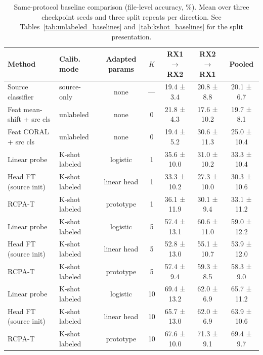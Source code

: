 \begin{table}[t]
\caption{Same-protocol baseline comparison (file-level accuracy, \%). Mean over three checkpoint seeds and three split repeats per direction. See Tables~\ref{tab:unlabeled_baselines} and~\ref{tab:kshot_baselines} for the split presentation.}
\label{tab:sota_baselines}
\centering
\small
\begin{tabular}{llccccc}
\toprule
Method & Calib. mode & Adapted params & $K$ & RX1$\rightarrow$RX2 & RX2$\rightarrow$RX1 & Pooled \\
\midrule
Source classifier & source-only & none & --- & 19.4 ± 3.4 & 20.8 ± 8.8 & 20.1 ± 6.7 \\
Feat mean-shift + src cls & unlabeled & none & 0 & 21.8 ± 4.3 & 17.6 ± 10.2 & 19.7 ± 8.1 \\
Feat CORAL + src cls & unlabeled & none & 0 & 19.4 ± 5.2 & 30.6 ± 11.3 & 25.0 ± 10.4 \\
Linear probe & K-shot labeled & logistic & 1 & 35.6 ± 10.0 & 31.0 ± 10.2 & 33.3 ± 10.4 \\
Head FT (source init) & K-shot labeled & linear head & 1 & 33.3 ± 10.2 & 27.3 ± 10.0 & 30.3 ± 10.6 \\
RCPA-T & K-shot labeled & prototype & 1 & 36.1 ± 11.9 & 30.1 ± 9.4 & 33.1 ± 11.2 \\
Linear probe & K-shot labeled & logistic & 5 & 57.4 ± 13.1 & 60.6 ± 11.0 & 59.0 ± 12.2 \\
Head FT (source init) & K-shot labeled & linear head & 5 & 52.8 ± 13.0 & 55.1 ± 10.7 & 53.9 ± 12.0 \\
RCPA-T & K-shot labeled & prototype & 5 & 57.4 ± 9.4 & 59.3 ± 8.5 & 58.3 ± 9.0 \\
Linear probe & K-shot labeled & logistic & 10 & 69.4 ± 13.2 & 62.0 ± 6.9 & 65.7 ± 11.2 \\
Head FT (source init) & K-shot labeled & linear head & 10 & 65.7 ± 13.0 & 62.0 ± 6.9 & 63.9 ± 10.6 \\
RCPA-T & K-shot labeled & prototype & 10 & 67.6 ± 10.0 & 71.3 ± 9.1 & 69.4 ± 9.7 \\
\bottomrule
\end{tabular}
\end{table}
